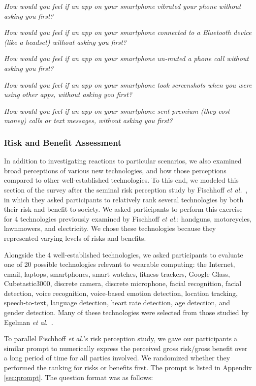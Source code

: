 \documentclass{acm_proc_article-sp}
\def\etal{{\it et al.~}}
\newenvironment{packed_enum}{
\begin{enumerate}
  \setlength{\itemsep}{1pt}
  \setlength{\parskip}{0pt}
  \setlength{\parsep}{0pt}
}{\end{enumerate}}
\begin{document}
\begin{packed_enum}
\item \textit{How would you feel if an app on your smartphone vibrated your phone without asking you first?}
\item \textit{How would you feel if an app on your smartphone connected to a Bluetooth device (like a headset) without asking you first?}
\item \textit{How would you feel if an app on your smartphone un-muted a phone call without asking you first?}
\item \textit{How would you feel if an app on your smartphone took screenshots when you were using other apps, without asking you first?}
\item \textit{How would you feel if an app on your smartphone sent premium (they cost money) calls or text messages, without asking you first?} 
\end{packed_enum}

\subsubsection{Risk and Benefit Assessment}
In addition to investigating reactions to particular scenarios, we also examined broad perceptions of various new technologies, and how those perceptions compared to other well-established technologies. To this end, we modeled this section of the survey after the seminal risk perception study by Fischhoff \etal\cite{Fischhoff}, in which they asked participants to relatively rank several technologies by both their risk and benefit to society. We asked participants to perform this exercise for 4 technologies previously examined by Fischhoff {\it et al.}: handguns, motorcycles, lawnmowers, and electricity. We chose these technologies because they represented varying levels of risks and benefits.

Alongside the 4 well-established technologies, we asked participants to evaluate one of 20 possible technologies relevant to wearable computing: the Internet, email, laptops, smartphones, smart watches, fitness trackers, Google Glass, Cubetastic3000, discrete camera, discrete microphone, facial recognition, facial detection, voice recognition, voice-based emotion detection, location tracking, speech-to-text, language detection, heart rate detection, age detection, and gender detection. Many of these technologies were selected from those studied by Egelman \etal\cite{Egelman2015}.

To parallel Fischhoff {\it et al.}'s risk perception study, we gave our participants a similar prompt to numerically express the perceived gross risk/gross benefit over a long period of time for all parties involved. We randomized whether they performed the ranking for risks or benefits first. The prompt is listed in Appendix \ref{sec:prompt}. The question format was as follows:
\end{document}
